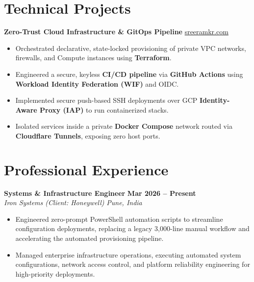 \documentclass[10pt,letterpaper]{article}
\begin{document}
\section{Technical Projects}

\textbf{Zero-Trust Cloud Infrastructure \& GitOps Pipeline} \hfill \href{https://sreeramkr.com}{sreeramkr.com}
\begin{itemize}[leftmargin=1.5em, itemsep=1pt, parsep=0pt]
\item Orchestrated declarative, state-locked provisioning of private VPC networks, firewalls, and Compute instances using \textbf{Terraform}.
\item Engineered a secure, keyless \textbf{CI/CD pipeline} via \textbf{GitHub Actions} using \textbf{Workload Identity Federation (WIF)} and OIDC.
\item Implemented secure push-based SSH deployments over GCP \textbf{Identity-Aware Proxy (IAP)} to run containerized stacks.
\item Isolated services inside a private \textbf{Docker Compose} network routed via \textbf{Cloudflare Tunnels}, exposing zero host ports.
\end{itemize}

\section{Professional Experience}

\textbf{Systems \& Infrastructure Engineer} \hfill \textbf{Mar 2026 -- Present}\\
\textit{Iron Systems (Client: Honeywell)} \hfill \textit{Pune, India}
\begin{itemize}[leftmargin=1.5em, itemsep=1pt, parsep=0pt]
    \item Engineered zero-prompt PowerShell automation scripts to streamline configuration deployments, replacing a legacy 3,000-line manual workflow and accelerating the automated provisioning pipeline.
    \item Managed enterprise infrastructure operations, executing automated system configurations, network access control, and platform reliability engineering for high-priority deployments.
\end{itemize}
\end{document}
